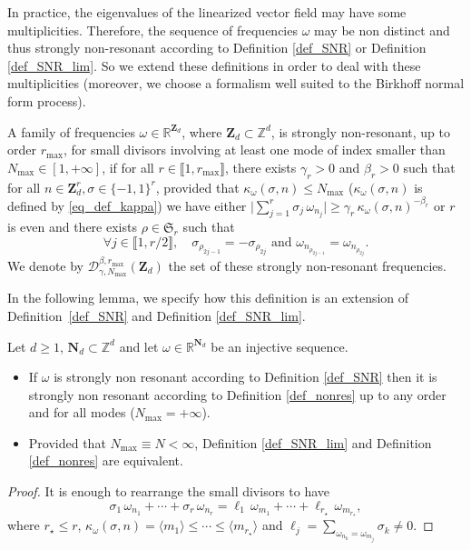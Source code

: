 In practice, the eigenvalues of the linearized vector field may have some multiplicities. Therefore, the sequence of frequencies $\omega$ may be non distinct and thus strongly non-resonant according to Definition \ref{def_SNR} or Definition \ref{def_SNR_lim}. So we extend these definitions in order to deal with these multiplicities (moreover, we choose a formalism well suited to the Birkhoff normal form process).
\begin{definition} \label{def_nonres} A family of frequencies $\omega\in \mathbb{R}^{\mathbf{Z}_d}$, where $\mathbf{Z}_d \subset \mathbb{Z}^d$, is strongly non-resonant, up to order $r_{\max}$, for small divisors involving at least one mode of index smaller than $N_{\max}\in [1,+\infty]$, if for all $r \in \llbracket 1,r_{\max} \rrbracket $, there exists $\gamma_r>0$ and $\beta_r>0$ such that for all $n \in \mathbf{Z}_d^{r}, \sigma \in \{ -1,1\}^{r}$, provided that $\kappa_\omega(\sigma,n)\leq N_{\max}$ ($\kappa_\omega(\sigma,n)$ is defined by \eqref{eq_def_kappa})
we have either
$
\big|\sum_{j=1}^{r} \sigma_j \, \omega_{n_j}\big| \geq \gamma_r \, \kappa_\omega(\sigma,n)^{-\beta_r}
$
or $r$ is even and there exists $\rho \in \mathfrak{S}_{r}$ such that
\[
\forall j \in \llbracket 1,r/2\rrbracket, \quad \sigma_{\rho_{2j-1}}= -\sigma_{\rho_{2j}} \text{ and } \omega_{n_{\rho_{2j-1}}}=\omega_{n_{\rho_{2j}}}.
\]
We denote by $\mathcal{D}_{\gamma,N_{\max}}^{\beta,r_{\max}}(\mathbf{Z}_d)$ the set of these strongly non-resonant frequencies.
\end{definition}
In the following lemma, we specify how this definition is an extension of Definition~\ref{def_SNR} and Definition \ref{def_SNR_lim}.

\begin{lemma} \label{lem_defs_equiv} Let $d\geq 1$, $\mathbf{N}_d \subset \mathbb{Z}^d$ and let $\omega \in \mathbb{R}^{\mathbf{N}_d}$ be an injective sequence.
\begin{itemize}
\item
If $\omega$ is strongly non resonant according to Definition \ref{def_SNR} then it is strongly non resonant according to Definition \ref{def_nonres} up to any order and for all modes (\ie $N_{\max} = +\infty$).

\item
Provided that $N_{\max}\equiv N<\infty$, Definition \ref{def_SNR_lim} and Definition \ref{def_nonres} are equivalent.
\end{itemize}
\end{lemma}
\begin{proof} It is enough to rearrange the small divisors to have
\[
\sigma_1 \, \omega_{n_1} + \cdots + \sigma_r \, \omega_{n_r} = \ell_1 \, \omega_{m_1} + \cdots + \ell_{r_\star} \, \omega_{m_{r_\star}},
\]
where $r_\star\leq r$, $\kappa_\omega(\sigma,n) = \langle m_1 \rangle \leq \cdots \leq \langle m_{r_{\star}} \rangle$ and $\ell_j =\sum_{\omega_{n_k} = \omega_{m_j}} \sigma_k \neq 0$.
\end{proof}

